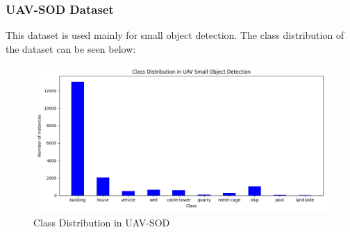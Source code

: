 \documentclass{beamer}
\begin{document}
\begin{frame}[t]
  \frametitle{UAV-SOD Dataset}
  This dataset is used mainly for small object detection. The class distribution of the dataset can be seen below:
  \begin{figure}[h!]
    \centering
    \includegraphics[scale=0.45]{Figures/uav_sod_data_class_distribution.png}
    \caption{Class Distribution in UAV-SOD}
    \label{fig:uav-class}
  \end{figure}
\end{frame}
\end{document}
